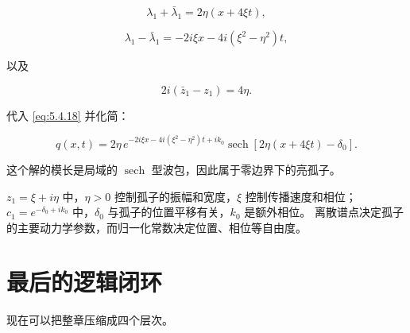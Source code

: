 \documentclass[
    lang=cn,
    scheme=chinese,
    mode=simple,
    device=normal,
    color=blue,
    math=cm,
    thmcnt=section,
    12pt,
    nowatermark
]{elegantbook}
\begin{document}
\[
    \lambda_1+\bar\lambda_1
    =
    2\eta(x+4\xi t),
\]

\[
    \lambda_1-\bar\lambda_1
    =
    -2i\xi x-4i(\xi^2-\eta^2)t,
\]

以及

\[
    2i(\bar z_1-z_1)=4\eta.
\]

代入 \eqref{eq:5.4.18} 并化简：

\[
    \boxed{
        q(x,t)
        =
        2\eta\,
        e^{-2i\xi x-4i(\xi^2-\eta^2)t+ik_0}
        \operatorname{sech}
        \!\left[
            2\eta(x+4\xi t)-\delta_0
            \right].
    }
\]

这个解的模长是局域的 $\operatorname{sech}$ 型波包，因此属于零边界下的亮孤子。

\begin{callout}[参数的直观意义]
    $z_1=\xi+i\eta$ 中，$\eta>0$ 控制孤子的振幅和宽度，$\xi$ 控制传播速度和相位；$c_1=e^{-\delta_0+ik_0}$ 中，$\delta_0$ 与孤子的位置平移有关，$k_0$ 是额外相位。
    离散谱点决定孤子的主要动力学参数，而归一化常数决定位置、相位等自由度。
\end{callout}

\section*{最后的逻辑闭环}

现在可以把整章压缩成四个层次。
\end{document}
